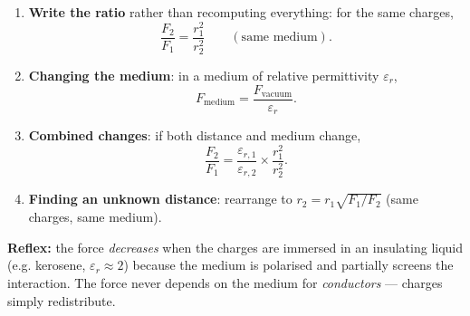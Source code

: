 \documentclass[11pt]{article}
\begin{document}
\begin{methode}
\begin{enumerate}
\item \textbf{Write the ratio} rather than recomputing everything: for the same charges,
\[ \frac{F_2}{F_1} = \frac{r_1^2}{r_2^2} \qquad (\text{same medium}). \]
\item \textbf{Changing the medium}: in a medium of relative permittivity $\varepsilon_r$,
\[ F_{\text{medium}} = \frac{F_{\text{vacuum}}}{\varepsilon_r}. \]
\item \textbf{Combined changes}: if both distance and medium change,
\[ \frac{F_2}{F_1} = \frac{\varepsilon_{r,1}}{\varepsilon_{r,2}}\times\frac{r_1^2}{r_2^2}. \]
\item \textbf{Finding an unknown distance}: rearrange to $r_2 = r_1\sqrt{F_1/F_2}$ (same charges, same medium).
\end{enumerate}
\textbf{Reflex:} the force \emph{decreases} when the charges are immersed in an insulating liquid (e.g. kerosene, $\varepsilon_r \approx 2$) because the medium is polarised and partially screens the interaction. The force never depends on the medium for \emph{conductors} --- charges simply redistribute.
\end{methode}
\end{document}
